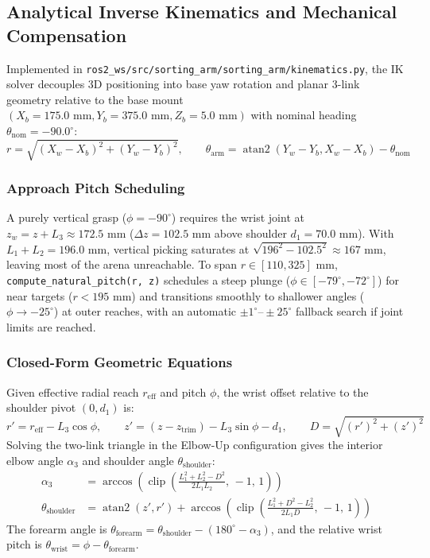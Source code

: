 \documentclass[11pt,a4paper]{article}
\begin{document}
\subsection{Analytical Inverse Kinematics and Mechanical Compensation}
Implemented in \texttt{ros2\_ws/\allowbreak src/\allowbreak sorting\_arm/\allowbreak sorting\_arm/\allowbreak kinematics.py}, the IK solver decouples 3D positioning into base yaw rotation and planar 3-link geometry relative to the base mount $(X_b = 175.0\text{ mm}, Y_b = 375.0\text{ mm}, Z_b = 5.0\text{ mm})$ with nominal heading $\theta_{\text{nom}} = -90.0^\circ$:
\begin{equation}
  r = \sqrt{(X_w - X_b)^2 + (Y_w - Y_b)^2}, \qquad
  \theta_{\text{arm}} = \operatorname{atan2}(Y_w - Y_b, X_w - X_b) - \theta_{\text{nom}}
\end{equation}

\subsubsection*{Approach Pitch Scheduling}
A purely vertical grasp ($\phi = -90^\circ$) requires the wrist joint at $z_w = z + L_3 \approx 172.5\text{ mm}$ ($\Delta z = 102.5\text{ mm}$ above shoulder $d_1 = 70.0\text{ mm}$). With $L_1 + L_2 = 196.0\text{ mm}$, vertical picking saturates at $\sqrt{196^2 - 102.5^2} \approx 167\text{ mm}$, leaving most of the arena unreachable. To span $r \in [110, 325]\text{ mm}$, \texttt{compute\_natural\_pitch(r, z)} schedules a steep plunge ($\phi \in [-79^\circ, -72^\circ]$) for near targets ($r < 195\text{ mm}$) and transitions smoothly to shallower angles ($\phi \to -25^\circ$) at outer reaches, with an automatic $\pm 1^\circ\text{--}\pm 25^\circ$ fallback search if joint limits are reached.

\subsubsection*{Closed-Form Geometric Equations}
Given effective radial reach $r_{\text{eff}}$ and pitch $\phi$, the wrist offset relative to the shoulder pivot $(0, d_1)$ is:
\begin{equation}
  r' = r_{\text{eff}} - L_3 \cos\phi, \qquad
  z' = (z - z_{\text{trim}}) - L_3 \sin\phi - d_1, \qquad
  D = \sqrt{(r')^2 + (z')^2}
\end{equation}
Solving the two-link triangle in the Elbow-Up configuration gives the interior elbow angle $\alpha_3$ and shoulder angle $\theta_{\text{shoulder}}$:
\begin{align}
  \alpha_3 &= \arccos\!\left(\operatorname{clip}\!\left(\frac{L_1^2 + L_2^2 - D^2}{2 L_1 L_2},\, -1,\, 1\right)\right) \\
  \theta_{\text{shoulder}} &= \operatorname{atan2}(z', r') + \arccos\!\left(\operatorname{clip}\!\left(\frac{L_1^2 + D^2 - L_2^2}{2 L_1 D},\, -1,\, 1\right)\right)
\end{align}
The forearm angle is $\theta_{\text{forearm}} = \theta_{\text{shoulder}} - (180^\circ - \alpha_3)$, and the relative wrist pitch is $\theta_{\text{wrist}} = \phi - \theta_{\text{forearm}}$.
\end{document}
